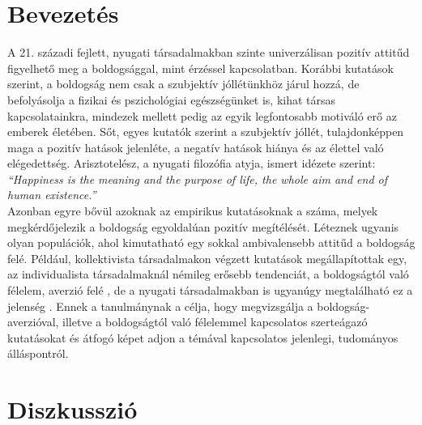 \section{Bevezetés}
A 21. századi fejlett, nyugati társadalmakban szinte univerzálisan pozitív attitűd figyelhető meg a boldogsággal, mint érzéssel kapcsolatban. Korábbi kutatások szerint, a boldogság nem csak a szubjektív jóllétünkhöz járul hozzá, de befolyásolja a fizikai és pszichológiai egészségünket is, kihat társas kapcsolatainkra, mindezek mellett pedig az egyik legfontosabb motiváló erő az emberek életében. Sőt, egyes kutatók szerint a szubjektív jóllét, tulajdonképpen maga a pozitív hatások jelenléte, a negatív hatások hiánya és az élettel való elégedettség.\cite{diener_suh_lucas_smith_1999} Arisztotelész, a nyugati filozófia atyja, ismert idézete szerint: \textit{“Happiness is the meaning and the purpose of life, the whole aim and end of human existence.”} \medskip 
\\ Azonban egyre bővül azoknak az empirikus kutatásoknak a száma, melyek megkérdő\-jelezik  a boldogság egyoldalúan pozitív megítélését. Léteznek ugyanis olyan populációk, ahol kimutatható egy sokkal ambivalensebb attitűd a boldogság felé. Például, kollektivista társadalmakon végzett kutatások megállapítottak egy, az individualista társa\-dalmaknál némileg erősebb tendenciát, a boldogságtól való félelem, averzió felé \cite{joshanloo_weijers_2013} \cite{joshanloo_lepshokova_panyusheva_natalia_poon_yeung_sundaram_achoui_asano_igarashi}, de a nyugati társadalmakban is ugyanúgy megtalálható ez a jelenség \cite{gilbert_mcewan_catarino_baiao_palmeira_2013}.  Ennek a tanulmánynak a célja, hogy megvizsgálja a boldogság-averzióval, illetve a boldogságtól való félelemmel kapcsolatos szerteágazó kutatásokat és átfogó képet adjon a témával kapcsolatos jelenlegi, tudományos álláspontról. \medskip 

\pagebreak
\section {Diszkusszió}
